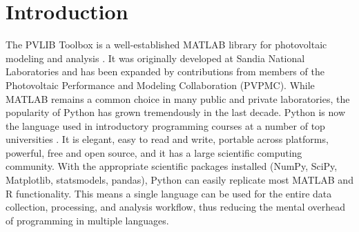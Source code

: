 \documentclass[conference]{IEEEtran}
\begin{document}
%



\section{Introduction}

The PVLIB Toolbox is a well-established MATLAB library for photovoltaic modeling and analysis \cite{pvlibstein}. 
It was originally developed at Sandia National Laboratories and has been expanded by contributions from members of the Photovoltaic Performance and Modeling Collaboration (PVPMC).
While MATLAB remains a common choice in many public and private laboratories, the popularity of Python has grown tremendously in the last decade. 
Python is now the language used in introductory programming courses at a number of top universities \cite{Per11, acmpython}. 
It is elegant, easy to read and write, portable across platforms, powerful, free and open source, and it has a large scientific computing community. 
With the appropriate scientific packages installed (NumPy, SciPy, Matplotlib, statsmodels, pandas), Python can easily replicate most MATLAB and R functionality. 
This means a single language can be used for the entire data collection, processing, and analysis workflow, thus reducing the mental overhead of programming in multiple languages. 
\end{document}
